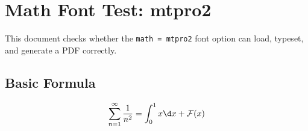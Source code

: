 \documentclass[lang = en, math = mtpro2, font = none, mode = simple]{elegantbook-l3}
\begin{document}
\frontmatter
\tableofcontents

\mainmatter
\chapter{Math Font Test: mtpro2}

This document checks whether the \texttt{math = mtpro2} font option can load,
typeset, and generate a PDF correctly.

\section{Basic Formula}

\[
  \sum_{n=1}^{\infty} \frac{1}{n^2}
  =
  \int_0^1 x\d x + \mathcal{F}(x)
\]
\end{document}
